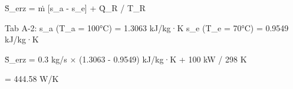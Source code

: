 Ṡ\_erz = ṁ [s\_a - s\_e] + Q̇\_R / T\_R  

Tab A-2:  
s\_a (T\_a = 100°C) = 1.3063 kJ/kg·K  
s\_e (T\_e = 70°C) = 0.9549 kJ/kg·K  

Ṡ\_erz = 0.3 kg/s × (1.3063 - 0.9549) kJ/kg·K + 100 kW / 298 K  

= 444.58 W/K